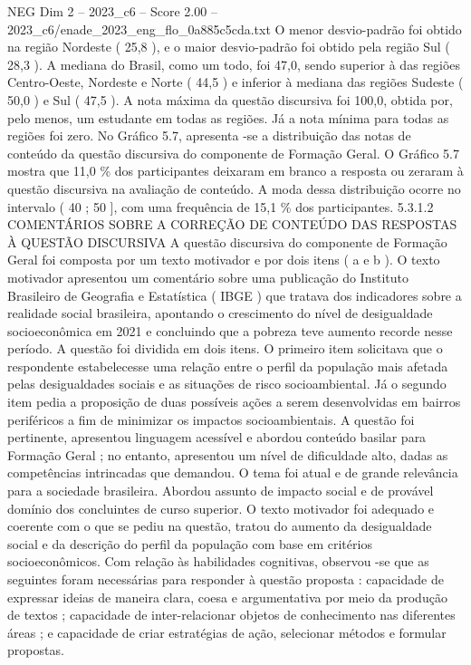 \begin{textsample}{NEG Dim 2 – 2023\_c6 – Score 2.00 – 2023\_c6/enade\_2023\_eng\_flo\_0a885c5cda.txt}
O menor desvio-padrão foi obtido na região Nordeste ( 25,8 ), e o maior desvio-padrão foi obtido pela região Sul ( 28,3 ).
A mediana do Brasil, como um todo, foi 47,0, sendo superior à das regiões Centro-Oeste, Nordeste e Norte ( 44,5 ) e inferior à mediana das regiões Sudeste ( 50,0 ) e Sul ( 47,5 ).
A nota máxima da questão discursiva foi 100,0, obtida por, pelo menos, um estudante em todas as regiões.
Já a nota mínima para todas as regiões foi zero.
No Gráfico 5.7, apresenta -se a distribuição das notas de conteúdo da questão discursiva do componente de Formação Geral.
O Gráfico 5.7 mostra que 11,0 \% dos participantes deixaram em branco a resposta ou zeraram à questão discursiva na avaliação de conteúdo.
A moda dessa distribuição ocorre no intervalo ( 40 ; 50 ], com uma frequência de 15,1 \% dos participantes. 5.3.1.2 COMENTÁRIOS SOBRE A CORREÇÃO DE CONTEÚDO DAS RESPOSTAS À QUESTÃO DISCURSIVA A questão discursiva do componente de Formação Geral foi composta por um texto motivador e por dois itens ( a e b ).
O texto motivador apresentou um comentário sobre uma publicação do Instituto Brasileiro de Geografia e Estatística ( IBGE ) que tratava dos indicadores sobre a realidade social brasileira, apontando o crescimento do nível de desigualdade socioeconômica em 2021 e concluindo que a pobreza teve aumento recorde nesse período.
A questão foi dividida em dois itens.
O primeiro item solicitava que o respondente estabelecesse uma relação entre o perfil da população mais afetada pelas desigualdades sociais e as situações de risco socioambiental.
Já o segundo item pedia a proposição de duas possíveis ações a serem desenvolvidas em bairros periféricos a fim de minimizar os impactos socioambientais.
A questão foi pertinente, apresentou linguagem acessível e abordou conteúdo basilar para Formação Geral ; no entanto, apresentou um nível de dificuldade alto, dadas as competências intrincadas que demandou.
O tema foi atual e de grande relevância para a sociedade brasileira.
Abordou assunto de impacto social e de provável domínio dos concluintes de curso superior.
O texto motivador foi adequado e coerente com o que se pediu na questão, tratou do aumento da desigualdade social e da descrição do perfil da população com base em critérios socioeconômicos.
Com relação às habilidades cognitivas, observou -se que as seguintes foram necessárias para responder à questão proposta : capacidade de expressar ideias de maneira clara, coesa e argumentativa por meio da produção de textos ; capacidade de inter-relacionar objetos de conhecimento nas diferentes áreas ; e capacidade de criar estratégias de ação, selecionar métodos e formular propostas.

\end{textsample}

